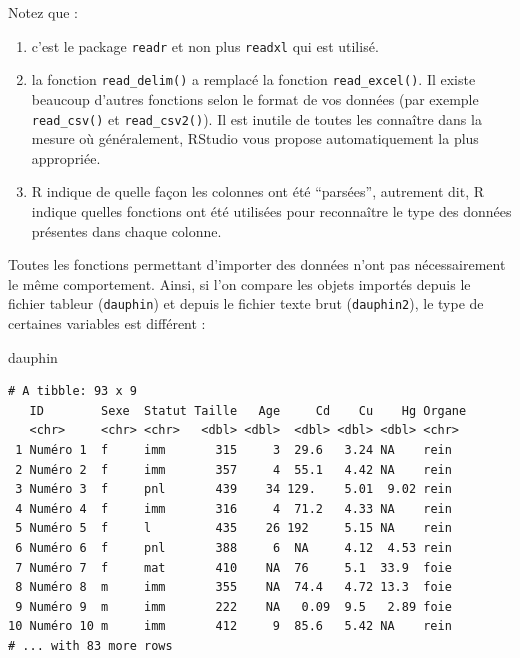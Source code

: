 \documentclass[a4paperpaper,]{article}
\newenvironment{Shaded}{\begin{snugshade}}{\end{snugshade}}
\newcommand{\NormalTok}[1]{#1}
\providecommand{\tightlist}{%
  \setlength{\itemsep}{0pt}\setlength{\parskip}{0pt}}
\theoremstyle{definition}
\theoremstyle{definition}
\theoremstyle{definition}
\theoremstyle{remark}
\begin{document}
Notez que :

\begin{enumerate}
\def\labelenumi{\arabic{enumi}.}
\tightlist
\item
  c'est le package \texttt{readr} et non plus \texttt{readxl} qui est
  utilisé.
\item
  la fonction \texttt{read\_delim()} a remplacé la fonction
  \texttt{read\_excel()}. Il existe beaucoup d'autres fonctions selon le
  format de vos données (par exemple \texttt{read\_csv()} et
  \texttt{read\_csv2()}). Il est inutile de toutes les connaître dans la
  mesure où généralement, RStudio vous propose automatiquement la plus
  appropriée.
\item
  R indique de quelle façon les colonnes ont été ``parsées'', autrement
  dit, R indique quelles fonctions ont été utilisées pour reconnaître le
  type des données présentes dans chaque colonne.
\end{enumerate}

Toutes les fonctions permettant d'importer des données n'ont pas
nécessairement le même comportement. Ainsi, si l'on compare les objets
importés depuis le fichier tableur (\texttt{dauphin}) et depuis le
fichier texte brut (\texttt{dauphin2}), le type de certaines variables
est différent :

\begin{Shaded}
\begin{Highlighting}[]
\NormalTok{dauphin}
\end{Highlighting}
\end{Shaded}

\begin{verbatim}
# A tibble: 93 x 9
   ID        Sexe  Statut Taille   Age     Cd    Cu    Hg Organe
   <chr>     <chr> <chr>   <dbl> <dbl>  <dbl> <dbl> <dbl> <chr> 
 1 Numéro 1  f     imm       315     3  29.6   3.24 NA    rein  
 2 Numéro 2  f     imm       357     4  55.1   4.42 NA    rein  
 3 Numéro 3  f     pnl       439    34 129.    5.01  9.02 rein  
 4 Numéro 4  f     imm       316     4  71.2   4.33 NA    rein  
 5 Numéro 5  f     l         435    26 192     5.15 NA    rein  
 6 Numéro 6  f     pnl       388     6  NA     4.12  4.53 rein  
 7 Numéro 7  f     mat       410    NA  76     5.1  33.9  foie  
 8 Numéro 8  m     imm       355    NA  74.4   4.72 13.3  foie  
 9 Numéro 9  m     imm       222    NA   0.09  9.5   2.89 foie  
10 Numéro 10 m     imm       412     9  85.6   5.42 NA    rein  
# ... with 83 more rows
\end{verbatim}
\end{document}
